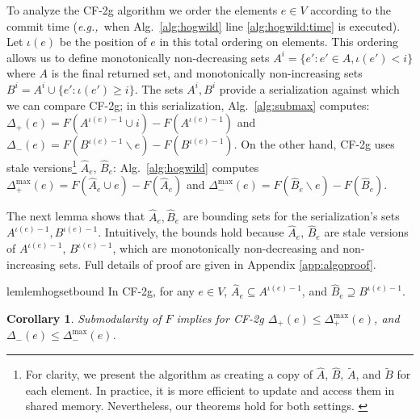 \documentclass{article} %
\newcommand{\eg}{{\em e.g.,}~}
\newcommand{\hogwild}{CF-2g}
\newtheorem{cor}[thm]{Corollary}
\newcommand{\algref}[1]{Alg.~\ref{#1}}
\begin{document}
To analyze the \hogwild{} algorithm we order the elements $e \in V$ according to the commit time (\eg when \algref{alg:hogwild} line \ref{alg:hogwild:time} is executed).
Let $\iota(e)$ be the position of $e$ in this total ordering on elements.
This ordering allows us to define monotonically non-decreasing sets $A^i = \{e' : e' \in A, \iota(e') < i\}$ where $A$ is the final returned set, and monotonically non-increasing sets $B^i = A^i \cup \{e': \iota(e') \geq i\}$.
The sets $A^i, B^i$ provide a serialization against which we can compare \hogwild{}; in this serialization, \algref{alg:submax} computes:
$\Delta_{+}       (e) = F(A^{\iota(e)-1}\cup i) - F(A^{\iota(e)-1})$
and
$\Delta_{-}       (e) = F(B^{\iota(e)-1}\backslash e) - F(B^{\iota(e)-1})$.
On the other hand, \hogwild{} uses stale versions\footnote{
  For clarity, we present the algorithm as creating a copy of $\hat{A}$, $\hat{B}$, $\tilde{A}$, and $\tilde{B}$ for each element. In practice, it is more efficient to update and access them in shared memory. Nevertheless, our theorems hold for both settings.
  \label{fn:copyvsshared}
}
$\hat{A}_e$, $\hat{B}_e$:
\algref{alg:hogwild} computes
$\Delta_{+}^{\max}(e) = F(\hat{A}_e\cup e) - F(\hat{A}_e)$
and
$\Delta_{-}^{\max}(e) = F(\hat{B}_e\backslash e) - F(\hat{B}_e)$.

The next lemma shows that $\hat{A}_e, \hat{B}_e$ are bounding sets for the serialization's sets $A^{\iota(e)-1}, B^{\iota(e)-1}$.
Intuitively, the bounds hold because $\hat{A}_e$, $\hat{B}_e$ are stale versions of $A^{\iota(e)-1}$, $B^{\iota(e)-1}$, which are monotonically non-decreasing and non-increasing sets.
Full details of proof are given in Appendix \ref{app:algoproof}.

\begin{restatable}{lem}{lemhogsetbound}\label{lem:hog:set_bound}
In \hogwild{}, for any $e\in V$, $\hat{A}_e \subseteq A^{\iota(e)-1}$, and $\hat{B}_e \supseteq B^{\iota(e)-1}$.
\end{restatable}

\begin{cor}\label{cor:hog:delta_bound}
Submodularity of $F$ implies for \hogwild{}
$\Delta_{+}(e) \leq \Delta_{+}^{\max}(e)$, and
$\Delta_{-}(e) \leq \Delta_{-}^{\max}(e)$.
\end{cor}
\end{document}
